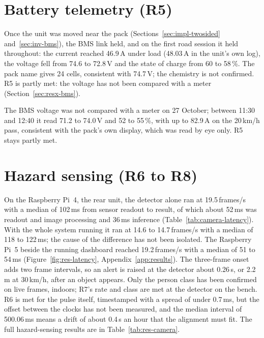 \section{Battery telemetry (R5)}
\label{sec:res-battery}

Once the unit was moved near the pack (Sections~\ref{sec:impl-twosided} and~\ref{sec:inv-bms}), the BMS link held, and on the first road session it held throughout: the current reached 46.9\,A under load (48.03\,A in the unit's own log), the voltage fell from 74.6 to 72.8\,V and the state of charge from 60 to 58\,\%. The pack name gives 24 cells, consistent with 74.7\,V; the chemistry is not confirmed. R5 is partly met: the voltage has not been compared with a meter (Section~\ref{sec:resx-bms}).

The BMS voltage was not compared with a meter on 27 October; between 11:30 and 12:40 it read 71.2 to 74.0\,V and 52 to 55\,\%, with up to 82.9\,A on the 20\,km/h pass, consistent with the pack's own display, which was read by eye only. R5 stays partly met.

\section{Hazard sensing (R6 to R8)}
\label{sec:res-hazard}

On the Raspberry Pi~4, the rear unit, the detector alone ran at 19.5\,frames/s with a median of 102\,ms from sensor readout to result, of which about 52\,ms was readout and image processing and 36\,ms inference (Table~\ref{tab:camera-latency}). With the whole system running it ran at 14.6 to 14.7\,frames/s with a median of 118 to 122\,ms; the cause of the difference has not been isolated. The Raspberry Pi~5 beside the running dashboard reached 19.2\,frames/s with a median of 51 to 54\,ms (Figure~\ref{fig:res-latency}, Appendix~\ref{app:results}). The three-frame onset adds two frame intervals, so an alert is raised at the detector about 0.26\,s, or 2.2\,m at 30\,km/h, after an object appears. Only the person class has been confirmed on live frames, indoors; R7's rate and class are met at the detector on the bench. R6 is met for the pulse itself, timestamped with a spread of under 0.7\,ms, but the offset between the clocks has not been measured, and the median interval of 500.06\,ms means a drift of about 0.4\,s an hour that the alignment must fit. The full hazard-sensing results are in Table~\ref{tab:res-camera}.

